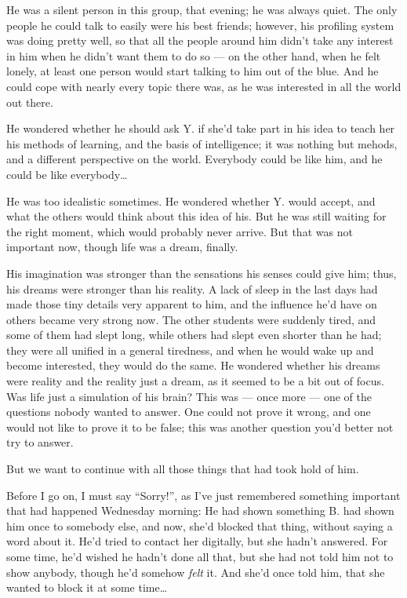 He was a silent person in this group, that evening; he was always quiet. The only people he could talk to easily were his best friends; however, his profiling system was doing pretty well, so that all the people around him didn't take any interest in him when he didn't want them to do so --- on the other hand, when he felt lonely, at least one person would start talking to him out of the blue. And he could cope with nearly every topic there was, as he was interested in all the world out there.

He wondered whether he should ask Y. if she'd take part in his idea to teach her his methods of learning, and the basis of intelligence; it was nothing but mehods, and a different perspective on the world. Everybody could be like him, and he could be like everybody\ldots

He was too idealistic sometimes. He wondered whether Y. would accept, and what the others would think about this idea of his. But he was still waiting for the right moment, which would probably never arrive.
But that was not important now, though life was a dream, finally.

His imagination was stronger than the sensations his senses could give him; thus, his dreams were stronger than his reality. A lack of sleep in the last days had made those tiny details very apparent to him, and the influence he'd have on others became  very strong now. The other students were suddenly tired, and some of them had slept long, while others had slept even shorter than he had; they were all unified in a general tiredness, and when he would wake up and become interested, they would do the same. He wondered whether his dreams were reality and the reality just a dream, as it seemed to be a bit out of focus. Was life just a simulation of his brain? This was --- once more --- one of the questions nobody wanted to answer. One could not prove it wrong, and one would not like to prove it to be false; this was another question you'd better not try to answer.

But we want to continue with all those things that had took hold of him.

Before I go on, I must say \enquote{Sorry!}, as I've just remembered something important that had happened Wednesday morning: He had shown something B. had shown him once to somebody else, and now, she'd blocked that thing, without saying a word about it. He'd tried to contact her digitally, but she hadn't answered. For some time, he'd wished he hadn't done all that, but she had not told him not to show anybody, though he'd somehow \emph{felt} it. And she'd once told him, that she wanted to block it at some time\ldots

